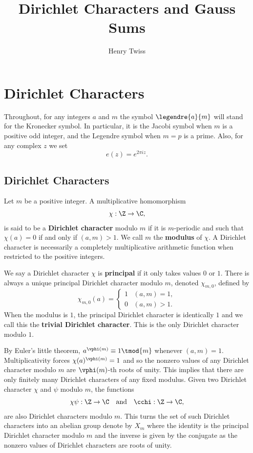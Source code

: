 \documentclass[12pt]{article}
\title{Dirichlet Characters and Gauss Sums}
\author{Henry Twiss}
\begin{document}
  \date{}
  \maketitle
  \section{Dirichlet Characters}
    Throughout, for any integers \(a\) and \(m\) the symbol \(\legendre{a}{m}\) will stand for the Kronecker symbol. In particular, it is the Jacobi symbol when \(m\) is a positive odd integer, and the Legendre symbol when \(m = p\) is a prime. Also, for any complex \(z\) we set
    \[
      e(z) = e^{2\pi iz}.
    \]
    \subsection{Dirichlet Characters}
      Let \(m\) be a positive integer. A multiplicative homomorphism
      \[
        \chi:\Z \to \C,
      \]
      is said to be a \textbf{Dirichlet character} modulo \(m\) if it is \(m\)-periodic and such that \(\chi(a) = 0\) if and only if \((a,m) > 1\). We call \(m\) the \textbf{modulus} of \(\chi\). A Dirichlet character is necessarily a completely multiplicative arithmetic function when restricted to the positive integers.
      
      We say a Dirichlet character \(\chi\) is \textbf{principal} if it only takes values \(0\) or \(1\). There is always a unique principal Dirichlet character modulo \(m\), denoted \(\chi_{m,0}\), defined by
      \[
        \chi_{m,0}(a) = \begin{cases} 1 & (a,m) = 1, \\ 0 & (a,m) > 1. \end{cases}
      \]
      When the modulus is \(1\), the principal Dirichlet character is identically \(1\) and we call this the \textbf{trivial Dirichlet character}. This is the only Dirichlet character modulo \(1\).
      
      By Euler's little theorem, \(a^{\vphi(m)} \equiv 1 \tmod{m}\) whenever \((a,m) = 1\). Multiplicativity forces \(\chi(a)^{\vphi(m)} = 1\) and so the nonzero values of any Dirichlet character modulo \(m\) are \(\vphi(m)\)-th roots of unity. This implies that there are only finitely many Dirichlet characters of any fixed modulus. Given two Dirichlet character \(\chi\) and \(\psi\) modulo \(m\), the functions
      \[
        \chi\psi:\Z \to \C \quad \text{and} \quad \cchi:\Z \to \C,
      \]
      are also Dirichlet characters modulo \(m\). This turns the set of such Dirichlet characters into an abelian group denote by \(X_{m}\) where the identity is the principal Dirichlet character modulo \(m\) and the inverse is given by the conjugate as the nonzero values of Dirichlet characters are roots of unity.
      
\end{document}
